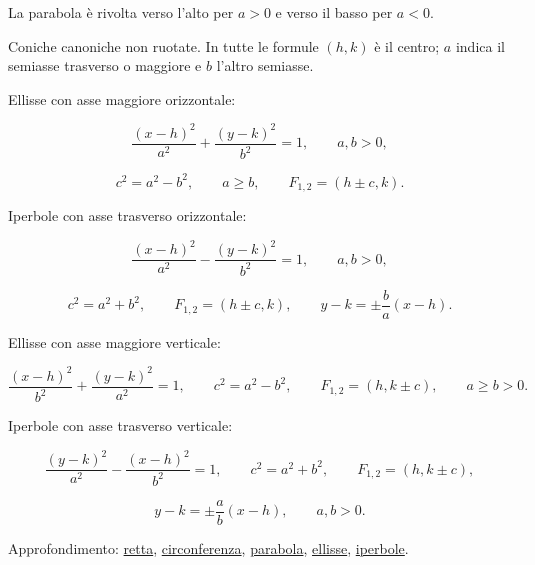 La parabola è rivolta verso l'alto per \(a>0\) e verso il basso per \(a<0\).

Coniche canoniche non ruotate. In tutte le formule \((h,k)\) è il centro; \(a\) indica il semiasse trasverso o maggiore e \(b\) l'altro semiasse.

Ellisse con asse maggiore orizzontale:

\[
\frac{(x-h)^2}{a^2}+\frac{(y-k)^2}{b^2}=1,
\qquad a,b>0,
\]

\[
c^2=a^2-b^2,
\qquad a\ge b,
\qquad
F_{1,2}=(h\pm c,k).
\]

Iperbole con asse trasverso orizzontale:

\[
\frac{(x-h)^2}{a^2}-\frac{(y-k)^2}{b^2}=1,
\qquad a,b>0,
\]

\[
c^2=a^2+b^2,
\qquad
F_{1,2}=(h\pm c,k),
\qquad
y-k=\pm\frac ba(x-h).
\]

Ellisse con asse maggiore verticale:

\[
\frac{(x-h)^2}{b^2}+\frac{(y-k)^2}{a^2}=1,
\qquad
c^2=a^2-b^2,
\qquad
F_{1,2}=(h,k\pm c),
\qquad a\ge b>0.
\]

Iperbole con asse trasverso verticale:

\[
\frac{(y-k)^2}{a^2}-\frac{(x-h)^2}{b^2}=1,
\qquad
c^2=a^2+b^2,
\qquad
F_{1,2}=(h,k\pm c),
\]

\[
y-k=\pm\frac ab(x-h),
\qquad a,b>0.
\]

Approfondimento: \href{https://ingegnerismo.it/matematica/retta/}{retta}, \href{https://ingegnerismo.it/matematica/circonferenza/}{circonferenza}, \href{https://ingegnerismo.it/matematica/parabola/}{parabola}, \href{https://ingegnerismo.it/matematica/ellisse/}{ellisse}, \href{https://ingegnerismo.it/matematica/iperbole/}{iperbole}.
